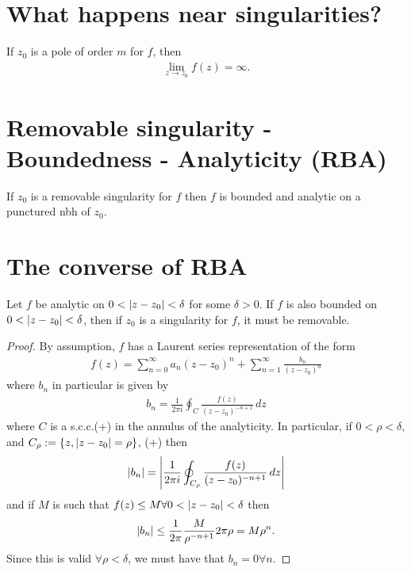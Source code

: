 \documentclass{article}
\theoremstyle{definition}
\newcommand{\f}[2]{\frac{#1}{#2}}
\begin{document}
\section{What happens near singularities?}

If $z_0$ is a pole of order $m$ for $f$, then 
\begin{align}
\lim_{z \to z_0} f(z) = \infty.
\end{align}


\section{Removable singularity - Boundedness - Analyticity (RBA)}
If $z_0$ is a removable singularity for $f$ then $f$ is bounded and analytic on a punctured nbh of $z_0$.


\section{The converse of RBA}
Let $f$ be analytic on $0 < \abs{z-z_0} < \delta $ for some $\delta > 0$. If $f$ is also bounded on $ 0 < \abs{z-z_0} < \delta$, then if $z_0$ is a singularity for $f$, it must be removable. \\

\noindent \begin{proof}
	By assumption, $f$ has a Laurent series representation of the form
	\begin{align}
	f(z) = \sum^\infty_{n=0}a_n(z-z_0)^n + \sum^\infty_{n=1}\f{b_n}{(z-z_0)^n}  
	\end{align}
	where $b_n$ in particular is given by
	\begin{align}
	b_n = \f{1}{2\pi i}\oint_C \f{f(z)}{(z-z_0)^{-n+1}}\,dz
	\end{align}
	where $C$ is a s.c.c.(+) in the annulus of the analyticity. In particular, if $0 < \rho < \delta$, and $C_\rho := \{ z, \abs{z - z_0} = \rho \}$, (+) then
	\begin{align}
	\abs{b_n} = \abs{\f{1}{2\pi i}\oint_{C_\rho} \f{f(z)}{(z-z_0)^{-n+1}}\,dz}
	\end{align} 
	and if $M$ is such that $f(z) \leq M \forall 0 < \abs{z-z_0} < \delta$ then 
	\begin{align}
	\abs{b_n} \leq \f{1}{2\pi}\f{M}{\rho^{-n+1}}2\pi \rho = M \rho^{n}.
	\end{align}
	Since this is valid $\forall \rho < \delta$, we must have that $b_n = 0 \forall n$. \qedhere
\end{proof}
\end{document}
